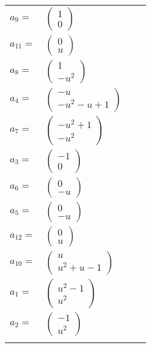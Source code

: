 \documentclass[1p]{elsarticle_modified}
\theoremstyle{definition}
\begin{document}
\begin{tabular}{m{7pt} m{180pt} m{7pt} m{180pt} }
\flushright $a_{9}=$&$\begin{pmatrix}1\\0\end{pmatrix}$ \\
\flushright $a_{11}=$&$\begin{pmatrix}0\\u\end{pmatrix}$ \\
\flushright $a_{8}=$&$\begin{pmatrix}1\\- u^2\end{pmatrix}$ \\
\flushright $a_{4}=$&$\begin{pmatrix}- u\\- u^2- u+1\end{pmatrix}$ \\
\flushright $a_{7}=$&$\begin{pmatrix}- u^2+1\\- u^2\end{pmatrix}$ \\
\flushright $a_{3}=$&$\begin{pmatrix}-1\\0\end{pmatrix}$ \\
\flushright $a_{6}=$&$\begin{pmatrix}0\\- u\end{pmatrix}$ \\
\flushright $a_{5}=$&$\begin{pmatrix}0\\- u\end{pmatrix}$ \\
\flushright $a_{12}=$&$\begin{pmatrix}0\\u\end{pmatrix}$ \\
\flushright $a_{10}=$&$\begin{pmatrix}u\\u^2+u-1\end{pmatrix}$ \\
\flushright $a_{1}=$&$\begin{pmatrix}u^2-1\\u^2\end{pmatrix}$ \\
\flushright $a_{2}=$&$\begin{pmatrix}-1\\u^2\end{pmatrix}$\\&\end{tabular}
\end{document}
